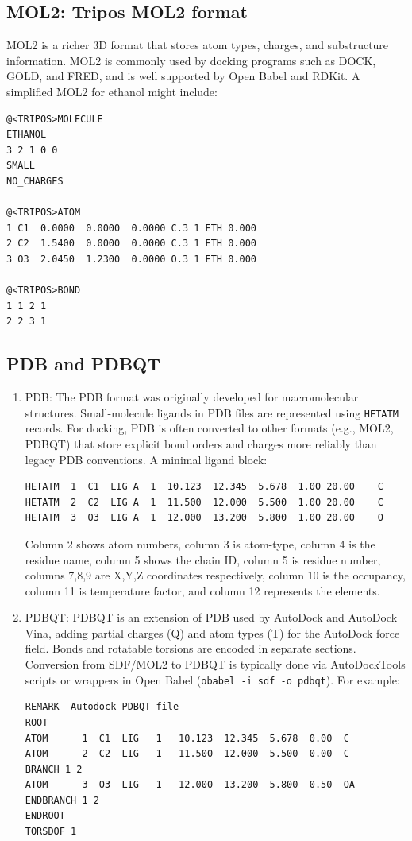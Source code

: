 \documentclass[12pt]{article}
\begin{document}
\subsection{MOL2: Tripos MOL2 format}

MOL2 is a richer 3D format that stores atom types, charges, and substructure information. MOL2 is commonly used by docking programs such as DOCK, GOLD, and FRED, and is well supported by Open Babel and RDKit. A simplified MOL2 for ethanol might include:

\begin{verbatim}
@<TRIPOS>MOLECULE
ETHANOL
3 2 1 0 0
SMALL
NO_CHARGES

@<TRIPOS>ATOM
1 C1  0.0000  0.0000  0.0000 C.3 1 ETH 0.000
2 C2  1.5400  0.0000  0.0000 C.3 1 ETH 0.000
3 O3  2.0450  1.2300  0.0000 O.3 1 ETH 0.000

@<TRIPOS>BOND
1 1 2 1
2 2 3 1
\end{verbatim}

\subsection{PDB and PDBQT}

\begin{enumerate}
\item PDB: The PDB format was originally developed for macromolecular structures.\cite{CH6_Berman2000} Small-molecule ligands in PDB files are represented using \verb|HETATM| records. For docking, PDB is often converted to other formats (e.g., MOL2, PDBQT) that store explicit bond orders and charges more reliably than legacy PDB conventions. A minimal ligand block:

\begin{verbatim}
HETATM  1  C1  LIG A  1  10.123  12.345  5.678  1.00 20.00    C
HETATM  2  C2  LIG A  1  11.500  12.000  5.500  1.00 20.00    C
HETATM  3  O3  LIG A  1  12.000  13.200  5.800  1.00 20.00    O
\end{verbatim}
Column 2 shows atom numbers, column 3 is atom-type, column 4 is the residue name, column 5 shows the chain ID, column 5 is residue number, columns 7,8,9 are X,Y,Z coordinates respectively, column 10 is the occupancy, column 11 is temperature factor, and column 12 represents the elements.

\item PDBQT: PDBQT is an extension of PDB used by AutoDock and AutoDock Vina, adding partial charges (Q) and atom types (T) for the AutoDock force field. Bonds and rotatable torsions are encoded in separate sections. Conversion from SDF/MOL2 to PDBQT is typically done via AutoDockTools scripts or wrappers in Open Babel (\verb|obabel -i sdf -o pdbqt|).
 For example:

\begin{verbatim}
REMARK  Autodock PDBQT file
ROOT
ATOM      1  C1  LIG   1   10.123  12.345  5.678  0.00  C 
ATOM      2  C2  LIG   1   11.500  12.000  5.500  0.00  C 
BRANCH 1 2
ATOM      3  O3  LIG   1   12.000  13.200  5.800 -0.50  OA
ENDBRANCH 1 2
ENDROOT
TORSDOF 1
\end{verbatim}
\end{enumerate}
\end{document}
